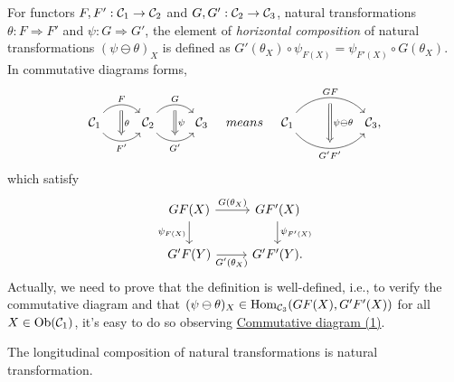 \documentclass{article}
\begin{document}
\begin{defi}\label{horizontal composition}
	For functors $F,F':\mathcal{C}_1\to\mathcal{C}_2$ and $G,G':\mathcal{C}_2\to\mathcal{C}_3$, natural transformations $\theta:F\Rightarrow F'$ and $\psi:G\Rightarrow G'$, the element of \emph{horizontal composition} of natural transformations $(\psi\ominus\theta)_X$ is defined as $G'(\theta_X)\circ\psi_{F(X)}=\psi_{F'(X)}\circ G(\theta_X)$. In commutative diagrams forms,
	\[\begin{tikzcd}
			\C_1 \arrow[bend left=50, r, "F", ""' name=F] \arrow[bend right=50, r, "F'"', "" name=F'] &
			\C_2 \arrow[bend left=50, r, "G", ""' name=G] \arrow[bend right=50, r, "G'"', "" name=G'] &
			\arrow[Rightarrow, from=F, to=F', "\theta"] \arrow[Rightarrow, from=G, to=G', "\psi"]\C_3
		\end{tikzcd}\quad{means}\quad\begin{tikzcd}
			\C_1
			\arrow[bend left=50, rr, "GF", ""' name=A]
			\arrow[bend right=50, rr, "G'F'"', "" name=B] & & 
			\arrow[Rightarrow, from=A, to=B, "\psi\ominus\theta"]\C_3,
		\end{tikzcd}\]
	which satisfy
	\begin{equation}\begin{tikzcd}\label{hor}
		GF(X) \arrow[r,"G(\theta_X)"] \arrow[d,"\psi_{F(X)}"'] & GF'(X) \arrow[d,"\psi_{F'(X)}"]\\
		G'F(Y) \arrow[r,"G'(\theta_X)"'] & G'F'(Y).
	\end{tikzcd}\end{equation}
	Actually, we need to prove that the definition is well-defined, i.e., to verify the commutative diagram and that $(\psi\ominus\theta)_X\in\mathrm{Hom}_{\mathcal{C}_3}(GF(X),G'F'(X))$ for all $X\in\mathrm{Ob}(\mathcal{C}_1)$, it's easy to do so observing \hyperref[ntr]{Commutative diagram (1)}.
\end{defi}


\begin{thm}
	The longitudinal composition of natural transformations is natural transformation.	
\end{thm}
\end{document}
